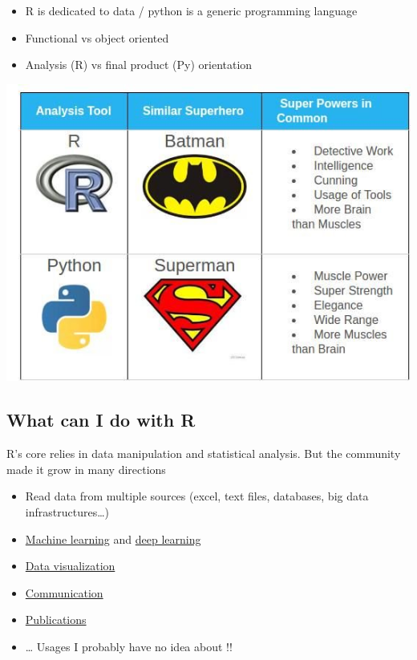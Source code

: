 \documentclass[
]{book}
\providecommand{\tightlist}{%
  \setlength{\itemsep}{0pt}\setlength{\parskip}{0pt}}
\begin{document}
\begin{itemize}
\tightlist
\item
  R is dedicated to data / python is a generic programming language
\item
  Functional vs object oriented
\item
  Analysis (R) vs final product (Py) orientation
\end{itemize}

\includegraphics{img/R-python.jpg}

\hypertarget{what-can-i-do-with-r}{%
\subsection{What can I do with R}\label{what-can-i-do-with-r}}

R's core relies in data manipulation and statistical analysis. But the community made it grow in many directions

\begin{itemize}
\tightlist
\item
  Read data from multiple sources (excel, text files, databases, big data infrastructures\ldots)
\item
  \href{https://rviews.rstudio.com/2019/06/19/a-gentle-intro-to-tidymodels/}{Machine learning} and \href{https://keras.rstudio.com/}{deep learning}
\item
  \href{https://www.r-graph-gallery.com/}{Data visualization}
\item
  \href{https://shiny.rstudio.com/gallery/}{Communication}
\item
  \href{https://bookdown.org/home/}{Publications}
\item
  \ldots{} Usages I probably have no idea about !!
\end{itemize}
\end{document}
